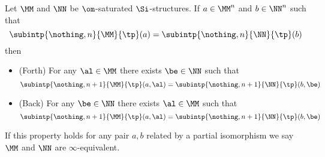 \begin{prop}
    Let $\MM$ and $\NN$ be $\om$-saturated $\Si$-structures.
    If $a \in \MM^n$ and $b \in \NN^n$ such that 
    \[\subintp{\nothing,n}{\MM}{\tp}(a) = 
    \subintp{\nothing,n}{\NN}{\tp}(b)\]
    then 
    \begin{itemize}
        \item (Forth) For any $\al \in \MM$ there exists $\be \in \NN$ such that
        \[\subintp{\nothing,n+1}{\MM}{\tp}(a,\al) = 
        \subintp{\nothing,n+1}{\NN}{\tp}(b,\be)\]
        \item (Back) For any $\be \in \NN$ there exists $\al \in \MM$ such that
        \[\subintp{\nothing,n+1}{\MM}{\tp}(a,\al) = 
        \subintp{\nothing,n+1}{\NN}{\tp}(b,\be)\]
    \end{itemize}
    If this property holds for any pair $a,b$ related by a partial isomorphism
    we say $\MM$ and $\NN$ are $\infty$-equivalent.
\end{prop}
